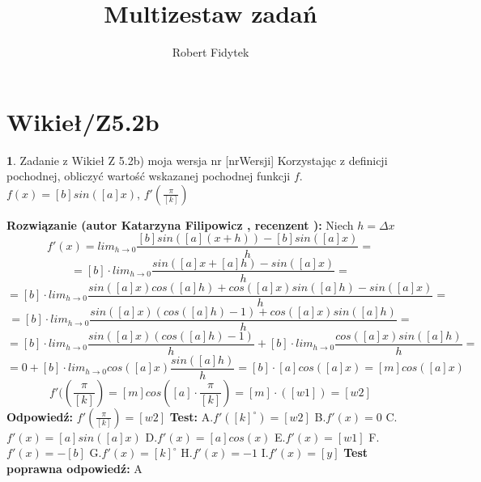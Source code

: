\documentclass[12pt, a4paper]{article}
\title{Multizestaw zadań}
\author{Robert Fidytek}
\date{}
\theoremstyle{definition} %
\newtheorem{zad}{}
\newcommand{\kategoria}[1]{\section{#1}} %
\newcommand{\zadStart}[1]{\begin{zad}#1\newline} %
\newcommand{\zadStop}{\end{zad}}   %
\newcommand{\rozwStart}[2]{\noindent \textbf{Rozwiązanie (autor #1 , recenzent #2): }\newline} %
\newcommand{\rozwStop}{\newline}                                            %
\newcommand{\odpStart}{\noindent \textbf{Odpowiedź:}\newline}    %
\newcommand{\odpStop}{\newline}                                             %
\newcommand{\testStart}{\noindent \textbf{Test:}\newline} %
\newcommand{\testStop}{\newline} %
\newcommand{\kluczStart}{\noindent \textbf{Test poprawna odpowiedź:}\newline} %
\newcommand{\kluczStop}{\newline} %
\begin{document}
\maketitle


\kategoria{Wikieł/Z5.2b}
\zadStart{Zadanie z Wikieł Z 5.2b) moja wersja nr [nrWersji]}
Korzystając z definicji pochodnej, obliczyć wartość wskazanej pochodnej funkcji $f$.\\
 $f(x)=[b]sin([a]x)$, $f'(\frac{\pi}{[k]})$
\zadStop
\rozwStart{Katarzyna Filipowicz}{}
Niech $h=\Delta x$
$$
f'(x)=lim_{h\rightarrow 0} \frac{[b]sin([a](x+h))-[b]sin([a]x)}{h}=
$$ $$
=[b] \cdot lim_{h\rightarrow 0} \frac{sin([a]x+[a]h)-sin([a]x)}{h}=
$$ $$
=[b]\cdot lim_{h\rightarrow 0} \frac{sin([a]x)cos([a]h)+cos([a]x)sin([a]h)-sin([a]x)}{h}=
$$ $$
=[b]\cdot lim_{h\rightarrow 0} \frac{sin([a]x)(cos([a]h)-1)+cos([a]x)sin([a]h)}{h}=
$$ $$
=[b]\cdot lim_{h\rightarrow 0} \frac{sin([a]x)(cos([a]h)-1)}{h}+[b]\cdot lim_{h\rightarrow 0}  \frac{cos([a]x)sin([a]h)}{h}=
$$ $$
=0+[b]\cdot lim_{h\rightarrow 0} cos([a]x)\frac{sin([a]h)}{h}=[b]\cdot [a]cos([a]x)=[m]cos([a]x)
$$ $$
f'((\frac{\pi}{[k]})=[m]cos([a]\cdot \frac{\pi}{[k]})=[m] \cdot ([w1])=[w2]
$$
\rozwStop
\odpStart
$f'(\frac{\pi}{[k]})=[w2]$
\odpStop
\testStart
A.$f'([k]^{\circ})=[w2]$
B.$f'(x)=0$
C.$f'(x)=[a]sin([a]x)$
D.$f'(x)=[a]cos(x)$
E.$f'(x)=[w1]$
F.$f'(x)=-[b]$
G.$f'(x)=[k]^{\circ}$
H.$f'(x)=-1$
I.$f'(x)=[y]$
\testStop
\kluczStart
A
\kluczStop
\end{document}
